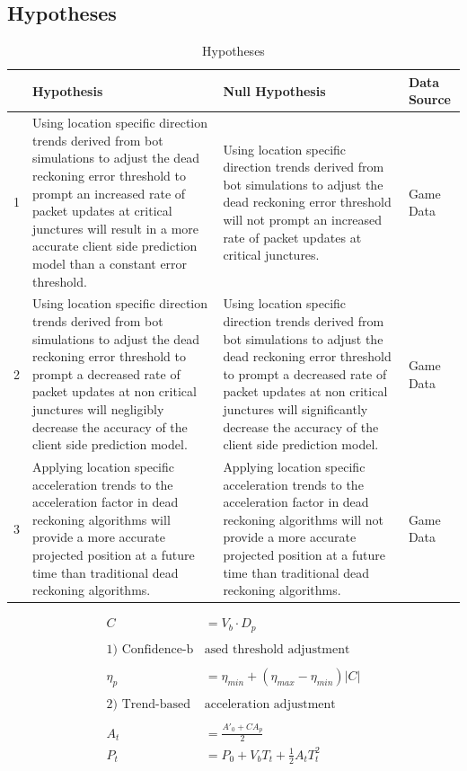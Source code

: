 \documentclass[journal]{IEEEtran}
\begin{document}
\subsection{Hypotheses} \label{hypothesis}

\begin{table}[h]
	\centering
	\caption{Hypotheses}
	\label{table:hypothesis}
	\def\arraystretch{1.5}
	\begin{tabular}{|c|p{7cm}|p{7cm}|p{1.75cm}|}
		\hline
		& \textbf{Hypothesis}& \textbf{Null Hypothesis} & \textbf{Data Source} \\ \hline
		1 & Using location specific direction trends derived from bot simulations to adjust the dead reckoning error threshold to prompt an increased rate of packet updates at critical junctures will result in a more accurate client side prediction model than a constant error threshold.
		& Using location specific direction trends derived from bot simulations to adjust the dead reckoning error threshold will not prompt an increased rate of packet updates at critical junctures.
		& Game Data \\ \hline
		2 & Using location specific direction trends derived from bot simulations to adjust the dead reckoning error threshold to prompt a decreased rate of packet updates at non critical junctures will negligibly decrease the accuracy of the client side prediction model.
		& Using location specific direction trends derived from bot simulations to adjust the dead reckoning error threshold to prompt a decreased rate of packet updates at non critical junctures will significantly decrease the accuracy of the client side prediction model.
		& Game Data \\ \hline
		3 & Applying location specific acceleration trends to the acceleration factor in dead reckoning algorithms will provide a more accurate projected position at a future time than traditional dead reckoning algorithms.
		& Applying location specific acceleration trends to the acceleration factor in dead reckoning algorithms will not provide a more accurate projected position at a future time than traditional dead reckoning algorithms.
		& Game Data \\ \hline
	\end{tabular}
\end{table}

\begin{align}
        C & = {V_b} \cdot {D_p} \\
        \nonumber \\
        \text{1) Confidence-b} & \text{ased threshold adjustment} \nonumber \\
        \nonumber \\
        \eta_p & = {\eta_{min}} + ({\eta_{max}} - {\eta_{min}}) |C| \\
        \nonumber \\
        \text{2) Trend-based } & \text{acceleration adjustment} \nonumber \\
        \nonumber \\
        A_t & = \frac{{A'_0} + C {A_p}}{2} \\
        P_t & = P_0 + {V_b}{T_t} + \frac{1}{2} {A_t} {T_t^2}
\end{align}
\end{document}
